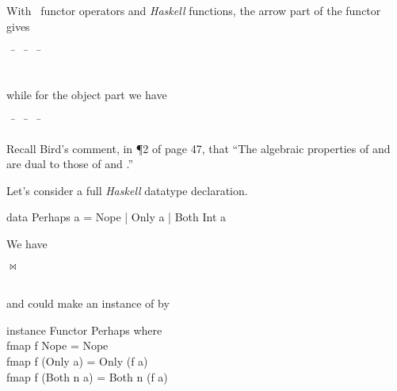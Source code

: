 \newslide

With \Ha \, functor operators and \textit{Haskell} functions,
the arrow part of the functor gives\\
\begin{codenott}
 ~ \= 
\bla{$\bowtie$} ~ \=  ~
\= \kill
{} \> \bla{$\bowtie$} \>
 \> \\
 \> \bla{$\bowtie$} \>
 \> 
\end{codenott}\\
while for the object part we have\\
\begin{codenott}
 ~ \= 
\bla{$\bowtie$} ~ \=  ~
\= \kill
{} \> \bla{$\bowtie$} \>
\\
 \> \bla{$\bowtie$} \>
\end{codenott}

Recall Bird's comment, in \P 2 of page 47, that 
``\textcolor{QuoteColor}{The algebraic properties of} 
\textcolor{QuoteColor}{and} 
\textcolor{QuoteColor}{are dual to those of} 
\textcolor{QuoteColor}{and} \textcolor{QuoteColor}{.}''

\newslide

Let's consider a full \textit{Haskell} datatype declaration.
\begin{code}
data Perhaps a = Nope | Only a | Both Int a
\end{code}

We have\\
\begin{codenott}
 $\bowtie$
\end{codenott}\\
and could make  an instance of  by
\begin{code}
instance Functor Perhaps where\\
   fmap f Nope = Nope\\
   fmap f (Only a) = Only (f a)\\
   fmap f (Both n a) = Both n (f a)
\end{code}

\newslide

